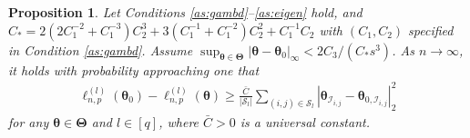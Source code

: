 \documentclass[12pt]{article}
\newtheorem{proposition}{Proposition}
\newcommand{\bTheta}{\boldsymbol \Theta}
\newcommand{\btheta}{\boldsymbol \theta}
\newcommand{\btc}{{\rm c}}
\newcommand{\0}{{\bf 0}}
\begin{document}
\begin{proposition}\label{pn:ident}
Let Conditions {\rm\ref{as:gambd}--\ref{as:eigen}} hold, and $C_*=2(2C_1^{-2}+C_1^{-3})C_2^3+3(C_1^{-1}+C_1^{-2})C_2^2+C_1^{-1}C_2$ with $(C_1,C_2)$ specified in Condition {\rm\ref{as:gambd}}. Assume $\sup_{\btheta\in\bTheta}|\btheta-\btheta_0|_\infty<2C_3/(C_*s^3)$.
As $n\rightarrow\infty$, it holds 
with probability approaching one that 
\begin{align*}
\ell_{n,p}^{(l)}(\btheta_0)-\ell_{n,p}^{(l)}(\btheta)\geq \frac{\bar{C}}{|\mathcal{S}_l|}\sum_{(i,j)\in\mathcal{S}_l}|\btheta_{\mathcal{I}_{i,j}}-\btheta_{0,\mathcal{I}_{i,j}}|_2^2
\end{align*}
for any $\btheta\in\bTheta$ and $l\in[q]$, where $\bar{C}>0$ is a universal constant.  
\end{proposition}

\end{document}
